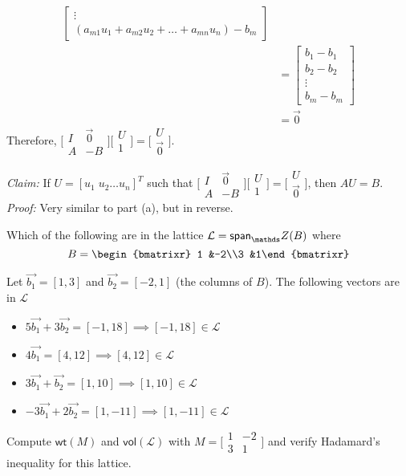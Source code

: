 \documentclass[11pt]{article}
\newcommand{\sbasiseq}{
\big[\begin{smallmatrix}
    I & \vec{0}\\
    A & -B
  \end{smallmatrix}\big]
  \big[\begin{smallmatrix}
    U \\ 1
  \end{smallmatrix}\big]
  =\big[
  \begin{smallmatrix}
    U \\ \vec{0}
  \end{smallmatrix}\big]
}
\begin{document}
\begin{sol}
\begin{enumalph}
\begin{align*}
\begin{bmatrix}
          \vdots\\
          (a_{m1}u_1+a_{m2}u_2+\dots+a_{mn}u_n) - b_m
        \end{bmatrix}\\
        &=\begin{bmatrix}b_1 - b_1\\b_2 - b_2\\\vdots\\b_m - b_m\end{bmatrix}\\
        &= \vec{0}
      \end{align*}
      Therefore, $\sbasiseq$.
    \item {\it Claim:} If $U=[u_1\; u_2 \ldots u_n]^T$ such that $\sbasiseq$, then $AU=B$. \\
      {\it Proof:} Very similar to part (a), but in reverse.
  \end{enumalph}
\end{sol}

\begin{prob}{8.2}
  Which of the following are in the lattice $\mathcal{L}=\laspan_\bbZ(B)$ where
  \begin{equation*}
    B=\begin{bmatrixr}{2}1 &-2\\3 &1\end{bmatrixr}
  \end{equation*}
\end{prob}
\begin{sol} Let $\vec{b_1}=[1,3]$ and $\vec{b_2}=[-2,1]$ (the columns of $B$). The following vectors are in $\mathcal{L}$
  \begin{itemize}
    \item $5\vec{b_1}+3\vec{b_2}=[-1,18] \implies [-1,18]\in\mathcal{L}$
    \item $4\vec{b_1}=[4,12] \implies [4,12]\in\mathcal{L}$
    \item $3\vec{b_1}+\vec{b_2}=[1,10] \implies [1,10]\in\mathcal{L}$
    \item $-3\vec{b_1}+2\vec{b_2}=[1,-11] \implies [1,-11]\in\mathcal{L}$
  \end{itemize}
\end{sol}

\begin{prob}{8.3} Compute $\mathsf{wt}(M)$ and $\mathsf{vol}({\mathcal{L}})$ with $M=\big[\begin{smallmatrix}1&-2\\3&1\end{smallmatrix}\big]$
and verify Hadamard's inequality for this lattice.\end{prob}
\end{document}
